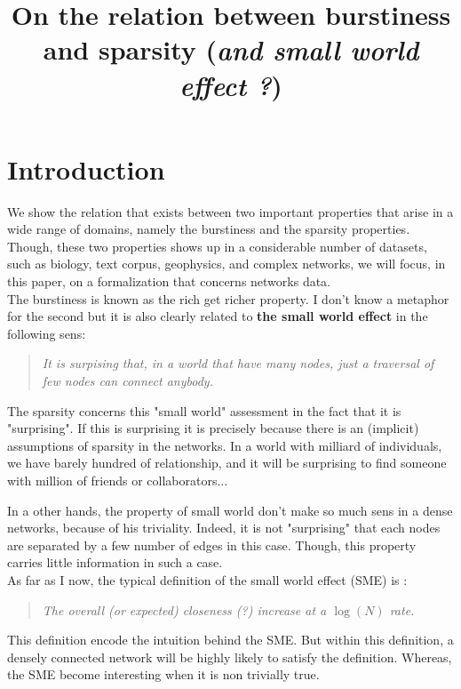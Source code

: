 \documentclass[a4paper, 12pt]{article}
\title{On the relation between burstiness and sparsity (\emph{and small world effect ?})}
\begin{document}
\maketitle

\section{Introduction}

We show the relation that exists between two important properties that arise in a wide range of domains, namely the burstiness and the sparsity properties. Though, these two properties shows up in a considerable number of datasets, such as biology, text corpus, geophysics, and complex networks, we will focus, in this paper, on a formalization that concerns networks data.~\\

The burstiness is known as the rich get richer property. I don't know a metaphor for the second but it is also clearly related to \textbf{the small world effect} in the following sens:

\begin{quote}
    \emph{It is surpising that, in a world that have many nodes, just a traversal of few nodes can connect anybody.}
\end{quote}

The sparsity concerns this "small world" assessment in the fact that it is "surprising". If this is surprising it is precisely because there is an (implicit) assumptions of sparsity in the networks. In a world with milliard of individuals, we have barely hundred of relationship, and it will be surprising to find someone with million of friends or collaborators...

In a other hands, the property of small world don't make so much sens in a dense networks, because of his triviality. Indeed, it is not "surprising" that each nodes are separated by a few number of edges in this case. Though, this property carries little information in such a case.  ~\\

As far as I now, the typical definition of the small world effect (SME) is :
\begin{quote}
    \emph{The overall (or expected) closeness (?) increase at a $\log(N)$ rate.}
\end{quote}

This definition encode the intuition behind the SME. But within this definition, a densely connected network will be highly likely to satisfy the definition. Whereas, the SME become interesting when it is non trivially true.~\\
\end{document}

